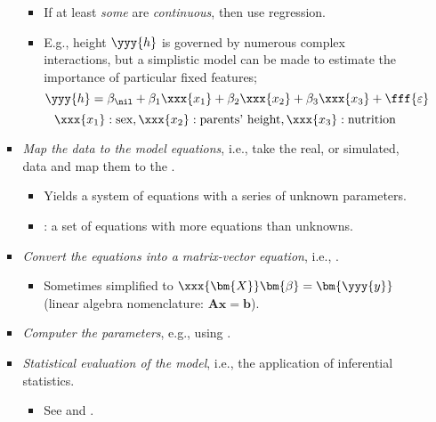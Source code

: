\begin{itemize}
\begin{itemize}
\begin{itemize}
\begin{itemize}
          \item If at least \emph{some}  are \emph{continuous}, then use regression.
          \item E.g., height \(\yyy{h}\) is governed by numerous complex interactions, but a simplistic model can be made to estimate the importance of particular fixed features;
          \[%
          \yyy{h} = \beta_\nil + \beta_1 \xxx{x_1} + \beta_2 \xxx{x_2} + \beta_3  \xxx{x_3} + \fff{\varepsilon}
          \]%
          \[%
          \xxx{x_1}: \text{sex},\xxx{x_2}: \text{parents' height}, \xxx{x_3}: \text{nutrition}
          \]%
        \end{itemize}
      \item \emph{Map the data to the model equations}, i.e.,  take the real, or simulated, data and map them to the .
        \begin{itemize}
          \item Yields a system of equations with a series of unknown parameters. 
          \item {}: a set of equations with more equations than unknowns.
        \end{itemize}
      \item \emph{Convert the equations into a matrix-vector equation}, i.e., \hyperref[Subsection: Multiple Regression]{}.
        \begin{itemize}
          \item Sometimes simplified to \(\xxx{\bm{X}}\bm{\beta} = \bm{\yyy{y}}\) (linear algebra nomenclature: \(\bm{Ax}=\bm{b}\)).
        \end{itemize}
      \item \emph{Computer the parameters}, e.g., using \hyperref[Subsection: Least-Squares]{}.
      \item \emph{Statistical evaluation of the model}, i.e., the application of inferential statistics.
        \begin{itemize}
          \item See \hyperref[Subsection: Model Significance]{} and \hyperref[Subsection: Standardized Coefficients]{}.
        \end{itemize}
    \end{itemize}
  \end{itemize}


\end{itemize}
